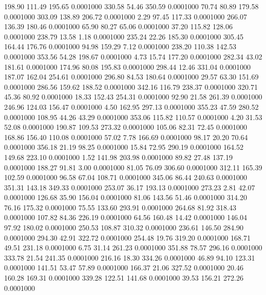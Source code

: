  198.90  111.49  195.65   0.0001000
 330.58   54.46  350.59   0.0001000
  70.74   80.89  179.58   0.0001000
 303.09  138.89  206.72   0.0001000
   2.29   97.45  117.33   0.0001000
 266.07  136.39  180.46   0.0001000
  65.90   80.27   65.06   0.0001000
  37.20  115.82  128.06   0.0001000
 238.79   13.58    1.18   0.0001000
 235.24   22.26  185.30   0.0001000
 305.45  164.44  176.76   0.0001000
  94.98  159.29    7.12   0.0001000
 238.20  110.38  142.53   0.0001000
 353.56   54.28  198.67   0.0001000
   4.73   15.74  177.20   0.0001000
 282.34   43.02  181.61   0.0001000
 174.96   80.08  195.83   0.0001000
 298.44   12.46  331.04   0.0001000
 187.07  162.04  254.61   0.0001000
 296.80   84.53  180.64   0.0001000
  29.57   63.30  151.69   0.0001000
 286.56  159.62  188.52   0.0001000
 342.16  116.79  238.37   0.0001000
 320.71   45.36   80.92   0.0001000
  18.33  152.43  254.31   0.0001000
  92.90   21.58  261.39   0.0001000
 246.96  124.03  156.47   0.0001000
   4.50  162.95  297.13   0.0001000
 355.23   47.59  280.52   0.0001000
 108.95   44.26   43.29   0.0001000
 353.06  115.82  110.57   0.0001000
   4.20   31.53   52.08   0.0001000
 190.87  109.53  273.32   0.0001000
 105.06   82.31   72.45   0.0001000
 168.86  156.40  110.08   0.0001000
  57.02    7.78  166.69   0.0001000
  98.17   20.20   70.64   0.0001000
 356.18   21.19   98.25   0.0001000
  15.84   72.95  290.19   0.0001000
 164.52  149.68  223.10   0.0001000
   1.52  141.98  203.98   0.0001000
  89.82   27.48  137.19   0.0001000
 188.27   91.81    3.00   0.0001000
  81.05   76.09  306.60   0.0001000
 312.11  165.39  102.59   0.0001000
  96.58   67.04  108.71   0.0001000
 345.06   86.44  240.63   0.0001000
 351.31  143.18  349.33   0.0001000
 253.07   36.17  193.13   0.0001000
 273.23    2.81   42.07   0.0001000
 126.68   35.90  156.04   0.0001000
  81.06  143.56   51.46   0.0001000
 314.20   76.16  175.32   0.0001000
  75.55  133.60  293.91   0.0001000
 264.68   81.92  318.43   0.0001000
 107.82   84.36  226.19   0.0001000
  64.56  160.48   14.42   0.0001000
 146.04   97.92  180.02   0.0001000
 250.53  108.87  310.32   0.0001000
 236.61  146.50  284.90   0.0001000
 294.30   42.91  322.72   0.0001000
 254.48   19.76  319.20   0.0001000
 168.71   49.51  231.18   0.0001000
   6.75   31.14  261.23   0.0001000
 351.88   78.57  296.16   0.0001000
 333.78   21.54  241.35   0.0001000
 216.16   18.30  334.26   0.0001000
  46.89   94.10  123.31   0.0001000
 141.51   53.47   57.89   0.0001000
 166.37   21.06  327.52   0.0001000
  20.46  160.28  169.31   0.0001000
 339.28  122.51  141.68   0.0001000
  39.53  156.21  272.26   0.0001000
